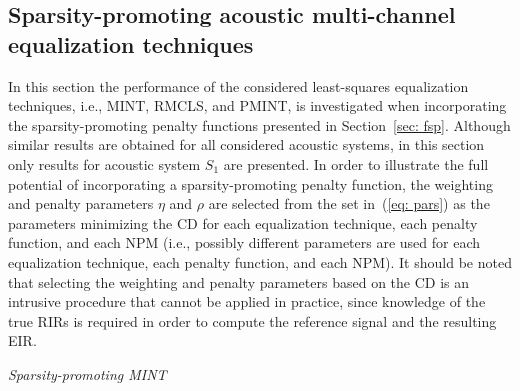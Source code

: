 \documentclass[10pt]{IEEEtran}
\begin{document}
\subsection{Sparsity-promoting acoustic multi-channel equalization techniques}
\label{sec: robust_increase}
In this section the performance of the considered least-squares equalization techniques, i.e., MINT, RMCLS, and PMINT, is investigated when incorporating the sparsity-promoting penalty functions presented in Section~\ref{sec: fsp}.
Although similar results are obtained for all considered acoustic systems, in this section only results for acoustic system $S_1$ are presented.
In order to illustrate the full potential of incorporating a sparsity-promoting penalty function, the weighting and penalty parameters $\eta$ and $\rho$ are selected from the set in~(\ref{eq: pars}) as the parameters minimizing the CD for each equalization technique, each penalty function, and each NPM (i.e., possibly different parameters are used for each equalization technique, each penalty function, and each NPM).
It should be noted that selecting the weighting and penalty parameters based on the CD is an intrusive procedure that cannot be applied in practice, since knowledge of the true RIRs is required in order to compute the reference signal and the resulting EIR.

\vskip 5pt
{\textit{Sparsity-promoting MINT}}
\vskip 5pt
\end{document}
